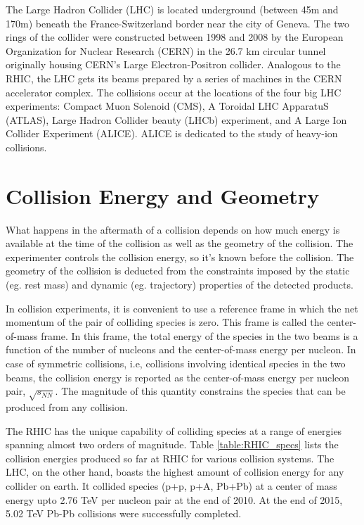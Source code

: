 The Large Hadron Collider (LHC) is located underground (between 45m and 170m) beneath the France-Switzerland border near the city of  Geneva. The two rings of the collider were constructed between 1998 and 2008 by the European Organization for Nuclear Research (CERN) in the 26.7 km circular tunnel originally housing CERN's Large Electron-Positron collider. Analogous to the RHIC, the LHC gets its beams prepared by a series of machines in the CERN accelerator complex. The collisions occur at the locations of the four big LHC experiments: Compact Muon Solenoid (CMS), A Toroidal LHC ApparatuS (ATLAS), Large Hadron Collider beauty (LHCb) experiment, and A Large Ion Collider Experiment (ALICE). ALICE is dedicated to the study of heavy-ion collisions. \cite{1748-0221-3-08-S08001}

\section{Collision Energy and Geometry}
What happens in the aftermath of a collision depends on how much energy is available at the time of the collision as well as the geometry of the collision. The experimenter controls the collision energy, so it's known before the collision. The geometry of the collision is deducted from the constraints imposed by the static (eg. rest mass) and dynamic (eg. trajectory) properties of the detected products.

In collision experiments, it is convenient to use a reference frame in which the net momentum of the pair of colliding species is zero. This frame is called the center-of-mass frame. In this frame, the total energy of the species in the two beams is a function of the number of nucleons and the center-of-mass energy per nucleon. In case of symmetric collisions, i.e, collisions involving identical species in the two beams, the collision energy is reported as the center-of-mass energy per nucleon pair, $\sqrt{s_{NN}}$. The magnitude of this quantity constrains the species that can be produced from any collision.


The RHIC has the unique capability of colliding species at a range of energies spanning almost two orders of magnitude. Table \ref{table:RHIC_specs} lists the collision energies produced so far at RHIC for various collision systems. The LHC, on the other hand, boasts the highest amount of collision energy for any collider on earth. It collided species (p+p, p+A, Pb+Pb) at a center of mass energy upto 2.76 TeV per nucleon pair at the end of 2010. At the end of 2015, 5.02 TeV Pb-Pb collisions were successfully completed. \cite{FOKA2016154}

